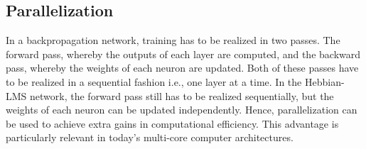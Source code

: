 \documentclass[a4paper]{article}
\begin{document}
\subsection{Parallelization}
In a backpropagation network, training has to be realized in two passes. The forward pass, whereby the outputs of each layer are computed, and the backward pass, whereby the weights of each neuron are updated. Both of these passes have to be realized in a sequential fashion i.e., one layer at a time. In the Hebbian-LMS network, the forward pass still has to be realized sequentially, but the weights of each neuron can be updated independently. Hence, parallelization can be used to achieve extra gains in computational efficiency. This advantage is particularly relevant in today's multi-core computer architectures. 
\end{document}
